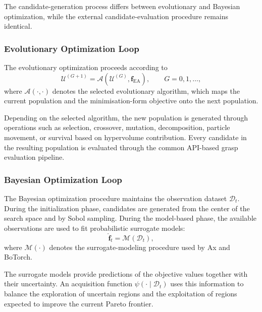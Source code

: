 The candidate-generation process differs between evolutionary and Bayesian optimization, while the
external candidate-evaluation procedure remains identical.

\subsubsection{Evolutionary Optimization Loop}

The evolutionary optimization proceeds according to
\begin{equation}
    \mathcal{U}^{(G+1)}
    =
    \mathcal{A}
    \left(
        \mathcal{U}^{(G)},
        \mathbf{f}_{\mathrm{EA}}
    \right),
    \qquad
    G=0,1,\dots,
\end{equation}
where $\mathcal{A}(\cdot,\cdot)$ denotes the selected evolutionary algorithm, which maps the current
population and the minimisation-form objective onto the next population.

Depending on the selected algorithm, the new population is generated through operations such as
selection, crossover, mutation, decomposition, particle movement, or survival based on hypervolume
contribution. Every candidate in the resulting population is evaluated through the common API-based
grasp evaluation pipeline.

\subsubsection{Bayesian Optimization Loop}

The Bayesian optimization procedure maintains the observation dataset $\mathcal{D}_t$. During the
initialization phase, candidates are generated from the center of the search space and by Sobol
sampling. During the model-based phase, the available observations are used to fit probabilistic
surrogate models:
\begin{equation}
    \widehat{\mathbf{f}}_t
    =
    \mathcal{M}(\mathcal{D}_t),
\end{equation}
where $\mathcal{M}(\cdot)$ denotes the surrogate-modeling procedure used by Ax and BoTorch.

The surrogate models provide predictions of the objective values together with their uncertainty. An
acquisition function $\psi(\cdot\mid\mathcal{D}_t)$ uses this information to balance the exploration
of uncertain regions and the exploitation of regions expected to improve the current Pareto
frontier.


